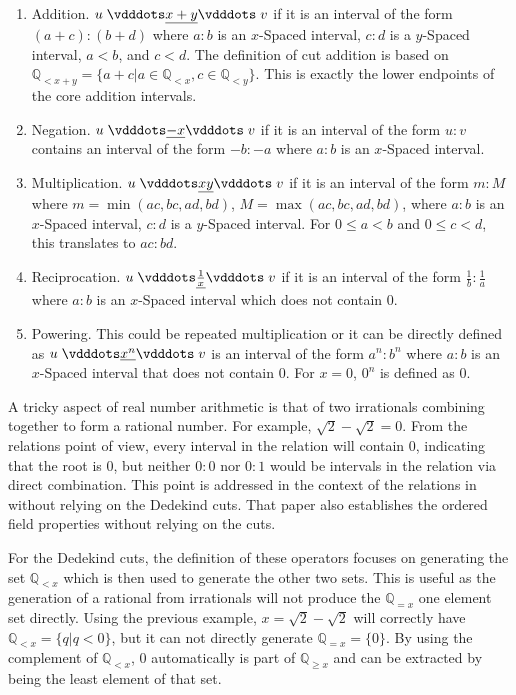 \documentclass[12pt]{article}
\newcommand{\qcut}[2][x]{\ensuremath{\mathbb{Q}_{#2 #1}}}
\newcommand{\qlt}[1][x]{\qcut[#1]{<}}
\newcommand{\qeq}[1][x]{\qcut[#1]{=}}
\newcommand{\qgeq}[1][x]{\qcut[#1]{\geq}}
\begin{document}
\begin{enumerate}
    \item Addition. $u \xrel[x+y] v$ if it is an interval of the form $(a+c):(b+d)$ where $a:b$ is an $x$-Spaced interval, $c:d$ is a $y$-Spaced interval, $a < b$, and $c < d$. The definition of cut addition is based on $\qlt[x+y] = \{a + c | a \in \qlt, c \in \qlt[y]\} $. This is exactly the lower endpoints of the core addition intervals. 
    \item Negation. $u \xrel[-x] v$ if it is an interval of the form $u:v$ contains an interval of the form $-b:-a$ where $a:b$ is an $x$-Spaced interval. 
    \item Multiplication. $u \xrel[xy] v$  if it is an interval of the form $m:M$ where $m = \min(ac, bc, ad, bd)$, $M = \max(ac, bc, ad, bd)$, where $a:b$ is an $x$-Spaced interval, $c:d$ is a $y$-Spaced interval. For $0 \leq a < b$ and $0 \leq c < d$, this translates to $ac:bd$. 
    \item Reciprocation. $u \xrel[\frac{1}{x}] v$ if it is an interval of the form $\frac{1}{b}:\frac{1}{a}$ where $a:b$ is an $x$-Spaced interval which does not contain 0. 
    \item Powering. This could be repeated multiplication or it can be directly defined as $u \xrel[x^n] v$ is an interval of the form $a^n: b^n$ where $a:b$ is an $x$-Spaced interval that does not contain 0. For $x = 0$, $0^n$ is defined as $0$. 
\end{enumerate}

A tricky aspect of real number arithmetic is that of two irrationals combining together to form a rational number. For example, $\sqrt{2} - \sqrt{2} = 0$. From the relations point of view, every interval in the relation will contain $0$, indicating that the root is $0$, but neither $0:0$ nor $0:1$ would be intervals in the relation via direct combination. This point is addressed in the context of the relations in \cite{taylor23main} without relying on the Dedekind cuts. That paper also establishes the ordered field properties without relying on the cuts. 

For the Dedekind cuts, the definition of these operators focuses on generating the set $\qlt$ which is then used to generate the other two sets. This is useful as the generation of a rational from irrationals will not produce the $\qeq$ one element set directly. Using the previous example, $ x = \sqrt{2} - \sqrt{2}$ will correctly have $\qlt = \{ q | q < 0\}$, but it can not directly generate $\qeq = \{0\}$. By using the complement of $\qlt$, 0 automatically is part of $\qgeq$ and can be extracted by being the least element of that set.
\end{document}
